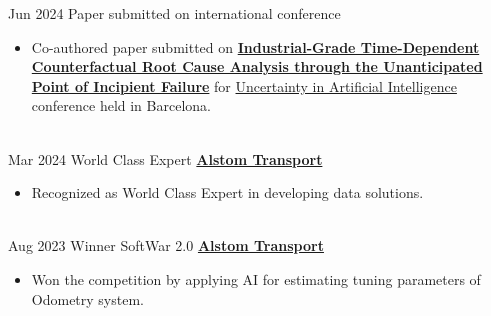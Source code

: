 \documentclass[letterpaper]{DS_class_file} %
\begin{document}
\begin{twenty} %
	\twentyitem
	{Jun 2024}
	{}
    {\hspace{0.3cm} Paper submitted on international conference}
	{}
	{}
	{\begin{itemize}
        \item Co-authored paper submitted on \href{https://arxiv.org/abs/2407.11056}{\textbf{Industrial-Grade Time-Dependent Counterfactual Root Cause Analysis through the Unanticipated Point of Incipient Failure}} for  \href{https://www.auai.org/uai2024/workshops}{Uncertainty in Artificial Intelligence} conference held in Barcelona.
	\end{itemize}}
	\\
    \twentyitem
	{Mar 2024}
	{}
	{\hspace{0.3cm}World Class Expert}
	{\href{https://www.alstom.com/alstom-india}{\textbf{Alstom Transport}}}
	{}
	{\begin{itemize}
			\item Recognized as World Class Expert in developing data solutions.
	\end{itemize}}
    \\
    \twentyitem
	{Aug 2023}
	{}
	{\hspace{0.3cm}Winner SoftWar 2.0}
	{\href{https://www.alstom.com/alstom-india}{\textbf{Alstom Transport}}}
	{}
	{\begin{itemize}
			\item Won the competition by applying AI for estimating tuning parameters of Odometry system.
	\end{itemize}}
    
\end{twenty}


\end{document}
